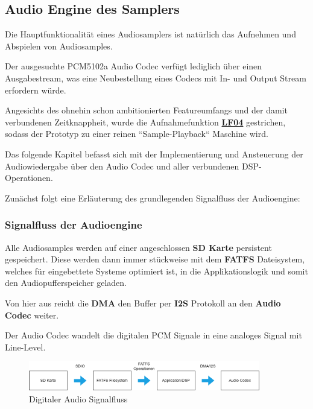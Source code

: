 \subsection{Audio Engine des Samplers}

Die Hauptfunktionalität eines Audiosamplers ist natürlich das Aufnehmen und Abspielen von Audiosamples. 

Der ausgesuchte PCM5102a Audio Codec verfügt lediglich über einen Ausgabestream, was eine Neubestellung eines Codecs mit In- und Output Stream erfordern würde.

Angesichts des ohnehin schon ambitionierten Featureumfangs und der damit verbundenen Zeitknappheit, wurde die Aufnahmefunktion \textbf{\hyperlink{lf-audiorecord}{LF04}} gestrichen, sodass der Prototyp zu einer reinen ``Sample-Playback`` Maschine wird. 

Das folgende Kapitel befasst sich mit der Implementierung und Ansteuerung der Audiowiedergabe über den Audio Codec und aller verbundenen DSP-Operationen.

Zunächst folgt eine Erläuterung des grundlegenden Signalfluss der Audioengine:

\subsubsection{Signalfluss der Audioengine}

Alle Audiosamples werden auf einer angeschlossen \textbf{SD Karte} persistent gespeichert. Diese werden dann immer stückweise mit dem \textbf{FATFS} Dateisystem, welches für eingebettete Systeme optimiert ist, in die Applikationslogik und somit den Audiopufferspeicher geladen. 

Von hier aus reicht die \textbf{DMA} den Buffer per \textbf{I2S} Protokoll an den \textbf{Audio Codec} weiter. 

Der Audio Codec wandelt die digitalen PCM Signale in eine analoges Signal mit Line-Level. %

\begin{figure}[h!]
	\centering
	\includegraphics[width=0.9\textwidth]{images/08_durchfuehrung/audio/audio_signalflow.drawio.png}
	\caption{Digitaler Audio Signalfluss}
	\label{fig:audio_signalflow}
\end{figure}


